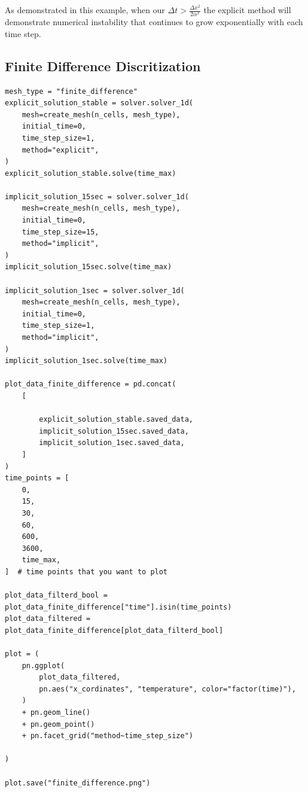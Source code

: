 \documentclass[letterpaper, 11pt]{article}
\begin{document}
As demonstrated in this example, when our  \(\Delta t > \frac{\Delta x ^2}{2 \alpha ^2}\) the explicit method will demonstrate numerical instability that continues to grow exponentially with each time step.




\subsection{Finite Difference Discritization}
\label{sec:org1623b1b}
\begin{verbatim}
mesh_type = "finite_difference"
explicit_solution_stable = solver.solver_1d(
    mesh=create_mesh(n_cells, mesh_type),
    initial_time=0,
    time_step_size=1,
    method="explicit",
)
explicit_solution_stable.solve(time_max)

implicit_solution_15sec = solver.solver_1d(
    mesh=create_mesh(n_cells, mesh_type),
    initial_time=0,
    time_step_size=15,
    method="implicit",
)
implicit_solution_15sec.solve(time_max)

implicit_solution_1sec = solver.solver_1d(
    mesh=create_mesh(n_cells, mesh_type),
    initial_time=0,
    time_step_size=1,
    method="implicit",
)
implicit_solution_1sec.solve(time_max)

plot_data_finite_difference = pd.concat(
    [

        explicit_solution_stable.saved_data,
        implicit_solution_15sec.saved_data,
        implicit_solution_1sec.saved_data,
    ]
)
time_points = [
    0,
    15,
    30,
    60,
    600,
    3600,
    time_max,
]  # time points that you want to plot

plot_data_filterd_bool = plot_data_finite_difference["time"].isin(time_points)
plot_data_filtered = plot_data_finite_difference[plot_data_filterd_bool]

plot = (
    pn.ggplot(
        plot_data_filtered,
        pn.aes("x_cordinates", "temperature", color="factor(time)"),
    )
    + pn.geom_line()
    + pn.geom_point()
    + pn.facet_grid("method~time_step_size")

)

plot.save("finite_difference.png")


\end{verbatim}
\end{document}
